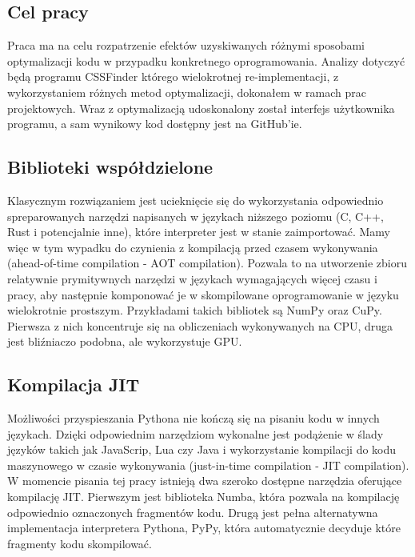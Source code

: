 \documentclass[12pt,a4paper]{article}
\begin{document}
\begin{sloppypar}
    \subsection{Cel pracy}

    Praca ma na celu rozpatrzenie efektów uzyskiwanych różnymi sposobami optymalizacji kodu
    w przypadku konkretnego oprogramowania. Analizy dotyczyć będą programu CSSFinder którego
    wielokrotnej re-implementacji, z wykorzystaniem różnych metod optymalizacji, dokonałem
    w ramach prac projektowych. Wraz z optymalizacją udoskonalony został interfejs użytkownika
    programu, a sam wynikowy kod dostępny jest na GitHub'ie\cite{CSSFinder_New}\cite{CSSFinder_New_Numpy}\cite{CSSFinder_New_Rust}.

    \subsection{Biblioteki współdzielone}

    Klasycznym
    rozwiązaniem jest ucieknięcie się do wykorzystania odpowiednio spreparowanych narzędzi
    napisanych w językach niższego poziomu (C, C++, Rust i potencjalnie inne), które
    interpreter jest w stanie zaimportować.  Mamy więc w tym wypadku do czynienia z
    kompilacją przed czasem wykonywania (ahead-of-time compilation - AOT compilation).
    Pozwala to na utworzenie zbioru relatywnie prymitywnych narzędzi w językach wymagających
    więcej czasu i pracy, aby następnie komponować je w skompilowane oprogramowanie
    w języku wielokrotnie prostszym. Przykładami takich bibliotek są NumPy oraz CuPy.
    Pierwsza z nich koncentruje się na obliczeniach wykonywanych na CPU, druga jest
    bliźniaczo podobna, ale wykorzystuje GPU.

    \subsection{Kompilacja JIT}

    Możliwości przyspieszania Pythona nie kończą się na pisaniu kodu w innych językach.
    Dzięki odpowiednim narzędziom wykonalne jest podążenie w ślady języków takich jak
    JavaScrip, Lua czy Java i wykorzystanie kompilacji do kodu maszynowego w czasie
    wykonywania (just-in-time compilation - JIT compilation).
    W momencie pisania tej pracy istnieją dwa szeroko dostępne narzędzia oferujące
    kompilację JIT. Pierwszym jest biblioteka Numba, która pozwala na kompilację
    odpowiednio oznaczonych fragmentów kodu. Drugą jest pełna alternatywna implementacja
    interpretera Pythona, PyPy, która automatycznie decyduje które fragmenty kodu
    skompilować.


\end{sloppypar}
\end{document}
